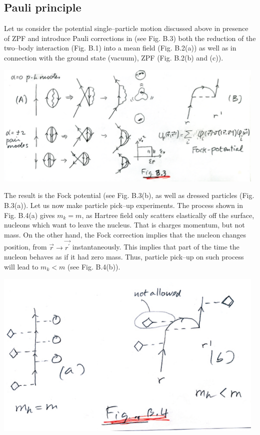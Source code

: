 \documentclass[a4paper,onecolumn,superscriptaddress,12pt,nofootinbib,twoside,raggedfooter,notitlepage]{revtex4-1}
\begin{document}
\subsection{Pauli principle}
Let us consider the potential single--particle motion discussed above in presence of ZPF and introduce Pauli corrections in (see Fig. B.3) both the reduction of the two--body interaction (Fig. B.1) into a mean field (Fig. B.2(a)) as well as in connection with the ground state (vacuum), ZPF (Fig. B.2(b) and (c)).
\begin{center}
	\includegraphics[width=0.98\textwidth]{figs/fig_b3}
\end{center}
The result is the Fock potential (see Fig. B.3(b), as well as dressed particles (Fig. B.3(a)). Let us now make particle pick--up experiments. The process shown in Fig. B.4(a) gives $m_k=m$, as Hartree field only scatters elastically off the surface, nucleons which want to leave the nucleus. That is charges momentum, but not mass. On the other hand, the Fock correction implies that the nucleon changes position, from $\vec{r}\rightarrow\vec{r^\prime}$ instantaneously. This implies that part of the time the nucleon behaves as if it had zero mass. Thus, particle pick--up on such process will lead to $m_k<m$ (see Fig. B.4(b)).
\begin{center}
	\includegraphics[width=0.98\textwidth]{figs/fig_b4}
\end{center}
\end{document}
